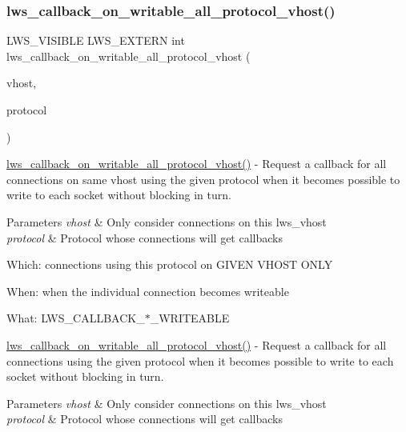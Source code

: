\subsubsection{\texorpdfstring{lws\+\_\+callback\+\_\+on\+\_\+writable\+\_\+all\+\_\+protocol\+\_\+vhost()}{lws\_callback\_on\_writable\_all\_protocol\_vhost()}}
{\footnotesize\ttfamily L\+W\+S\+\_\+\+V\+I\+S\+I\+B\+LE L\+W\+S\+\_\+\+E\+X\+T\+E\+RN int lws\+\_\+callback\+\_\+on\+\_\+writable\+\_\+all\+\_\+protocol\+\_\+vhost (\begin{DoxyParamCaption}\item[{const struct lws\+\_\+vhost $\ast$}]{vhost,  }\item[{const struct \hyperlink{structlws__protocols}{lws\+\_\+protocols} $\ast$}]{protocol }\end{DoxyParamCaption})}

\hyperlink{group__callback-when-writeable_ga8570860e191b62db264f2bac67354ea8}{lws\+\_\+callback\+\_\+on\+\_\+writable\+\_\+all\+\_\+protocol\+\_\+vhost()} -\/ Request a callback for all connections on same vhost using the given protocol when it becomes possible to write to each socket without blocking in turn.


\begin{DoxyParams}{Parameters}
{\em vhost} & Only consider connections on this lws\+\_\+vhost \\
\hline
{\em protocol} & Protocol whose connections will get callbacks\\
\hline
\end{DoxyParams}

\begin{DoxyItemize}
\item Which\+: connections using this protocol on G\+I\+V\+EN V\+H\+O\+ST O\+N\+LY
\item When\+: when the individual connection becomes writeable
\item What\+: L\+W\+S\+\_\+\+C\+A\+L\+L\+B\+A\+C\+K\+\_\+$\ast$\+\_\+\+W\+R\+I\+T\+E\+A\+B\+LE
\end{DoxyItemize}

\hyperlink{group__callback-when-writeable_ga8570860e191b62db264f2bac67354ea8}{lws\+\_\+callback\+\_\+on\+\_\+writable\+\_\+all\+\_\+protocol\+\_\+vhost()} -\/ Request a callback for all connections using the given protocol when it becomes possible to write to each socket without blocking in turn.


\begin{DoxyParams}{Parameters}
{\em vhost} & Only consider connections on this lws\+\_\+vhost \\
\hline
{\em protocol} & Protocol whose connections will get callbacks\\
\hline
\end{DoxyParams}

